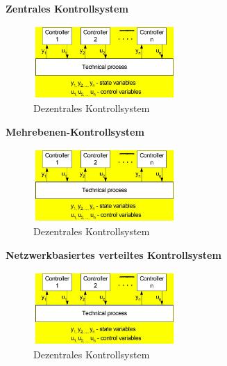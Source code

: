 \documentclass[12pt,a4paper,ngerman]{article}
\begin{document}
\textbf{Zentrales Kontrollsystem}
\\
\begin{figure}[h!]
\vspace{-20pt}
  \begin{center}
    \includegraphics[width=0.48\textwidth]{figures/dezentral.pdf}
  \end{center}
  \caption{Dezentrales Kontrollsystem}
\vspace{-10pt}
\end{figure}
\textbf{Mehrebenen-Kontrollsystem}
\\
\begin{figure}[h!]
\vspace{-20pt}
  \begin{center}
    \includegraphics[width=0.48\textwidth]{figures/dezentral.pdf}
  \end{center}
  \caption{Dezentrales Kontrollsystem}
\vspace{-10pt}
\end{figure}
\textbf{Netzwerkbasiertes verteiltes Kontrollsystem}
\\
\begin{figure}[h!]
\vspace{-20pt}
  \begin{center}
    \includegraphics[width=0.48\textwidth]{figures/dezentral.pdf}
  \end{center}
  \caption{Dezentrales Kontrollsystem}
\vspace{-10pt}
\end{figure}
\end{document}
